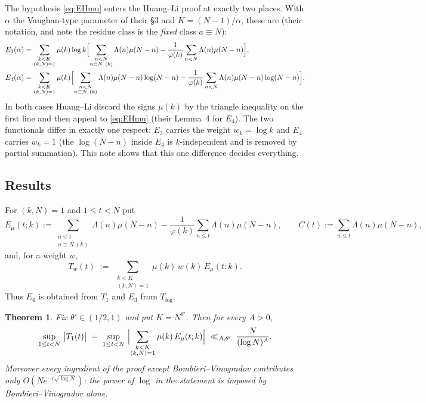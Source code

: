 \documentclass[11pt,a4paper]{article}
\theoremstyle{plain}
\newtheorem{theorem}{Theorem}
\theoremstyle{definition}
\newcommand{\Emu}{E_\mu}
\begin{document}
The hypothesis \eqref{eq:EHmu} enters the Huang--Li proof at exactly two
places. With $\alpha$ the Vaughan-type parameter of their §3 and
$K=(N-1)/\alpha$, these are (their notation, and note the residue class
is the \emph{fixed} class $a\equiv N$):
\begin{align}
  E_3(\alpha) &= \sum_{\substack{k<K\\ (k,N)=1}}\mu(k)\log k
    \Bigl[\sum_{\substack{n<N\\ n\equiv N\ (k)}}\Lambda(n)\mu(N-n)
      -\frac{1}{\varphi(k)}\sum_{n<N}\Lambda(n)\mu(N-n)\Bigr],
      \label{eq:E3}\\
  E_4(\alpha) &= \sum_{\substack{k<K\\ (k,N)=1}}\mu(k)
    \Bigl[\sum_{\substack{n<N\\ n\equiv N\ (k)}}\Lambda(n)\mu(N-n)\log(N-n)
      -\frac{1}{\varphi(k)}\sum_{n<N}\Lambda(n)\mu(N-n)\log(N-n)\Bigr].
      \label{eq:E4}
\end{align}
In both cases Huang--Li discard the signs $\mu(k)$ by the triangle
inequality on the first line and then appeal to \eqref{eq:EHmu} (their
Lemma~4 for $E_4$). The two functionals differ in exactly one respect:
$E_3$ carries the weight $w_k=\log k$ and $E_4$ carries $w_k=1$ (the
$\log(N-n)$ inside $E_4$ is $k$-independent and is removed by partial
summation). This note shows that this one difference decides everything.

\subsection{Results}

For $(k,N)=1$ and $1\le t<N$ put
\begin{equation}\label{eq:Emu}
  \Emu(t;k) := \sum_{\substack{n\le t\\ n\equiv N\ (k)}}\Lambda(n)\mu(N-n)
             - \frac{1}{\varphi(k)}\sum_{n\le t}\Lambda(n)\mu(N-n),
  \qquad
  C(t) := \sum_{n\le t}\Lambda(n)\mu(N-n),
\end{equation}
and, for a weight $w$,
\[
  T_w(t) \;:=\; \sum_{\substack{k<K\\ (k,N)=1}} \mu(k)\,w(k)\,\Emu(t;k).
\]
Thus $E_4$ is obtained from $T_1$ and $E_3$ from $T_{\log}$.

\begin{theorem}\label{thm:A}
Fix $\theta'\in(1/2,1)$ and put $K=N^{\theta'}$. Then for every $A>0$,
\[
  \sup_{1\le t<N}\ \bigl|T_1(t)\bigr|
  \;=\;\sup_{1\le t<N}\
  \Bigl|\sum_{\substack{k<K\\(k,N)=1}}\mu(k)\,\Emu(t;k)\Bigr|
  \;\ll_{A,\theta'}\; \frac{N}{(\log N)^{A}} .
\]
Moreover every ingredient of the proof except Bombieri--Vinogradov
contributes only $O\!\left(N e^{-c\sqrt{\log N}}\right)$: the power of
$\log$ in the statement is imposed by Bombieri--Vinogradov alone.
\end{theorem}
\end{document}
